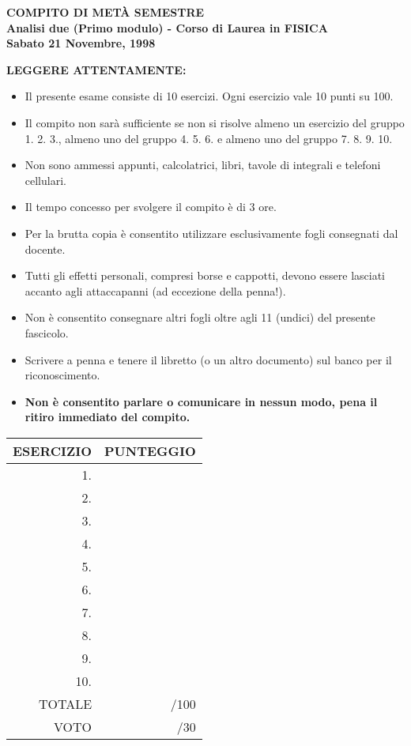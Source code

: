 \documentclass[12pt,a4paper]{report}\pagenumbering{roman}
\begin{document}
\begin{center}
{\bf COMPITO DI MET\`A SEMESTRE}\\
{\bf Analisi due (Primo modulo) - Corso di Laurea in FISICA}\\
{\bf Sabato 21 Novembre, 1998}
\end{center}
{\Large\bf LEGGERE ATTENTAMENTE:}
\begin{itemize}
\item Il presente esame consiste di 10 esercizi. Ogni esercizio 
vale 10 punti su 100.
\item Il compito non sar\`a sufficiente se non si risolve almeno 
un esercizio del gruppo 1. 2. 3., almeno 
uno del gruppo 4. 5. 6. e almeno uno del gruppo  7. 8. 9. 10.
\item Non sono ammessi appunti, calcolatrici, 
libri, tavole di integrali e telefoni cellulari.
\item Il tempo concesso per svolgere il compito \`e di 3 ore.
\item Per la brutta copia \`e consentito utilizzare 
esclusivamente fogli consegnati dal docente.
\item Tutti gli effetti personali, compresi borse e cappotti, devono 
essere lasciati accanto agli attaccapanni (ad eccezione della penna!).
\item Non \`e consentito consegnare altri fogli oltre agli 11 (undici)
del presente fascicolo.
\item Scrivere a penna e tenere il libretto (o un altro documento) sul banco per
il riconoscimento.
\item {\bf Non \`e consentito parlare o comunicare in nessun modo, pena
il ritiro immediato del compito.} 
\end{itemize}
\begin{center}
\begin{tabular}{||r|r||}
\hline ESERCIZIO & PUNTEGGIO\\  \hline
\hline 1.& \\
\hline 2.& \\
\hline 3.& \\
\hline 4.& \\
\hline 5.& \\
\hline 6.& \\
\hline 7.& \\
\hline 8.& \\
\hline 9.& \\
\hline 10.& \\
\hline TOTALE & /100\\
\hline VOTO& /30\\
\hline
\end{tabular}
\end{center}
\pagebreak
\end{document}
